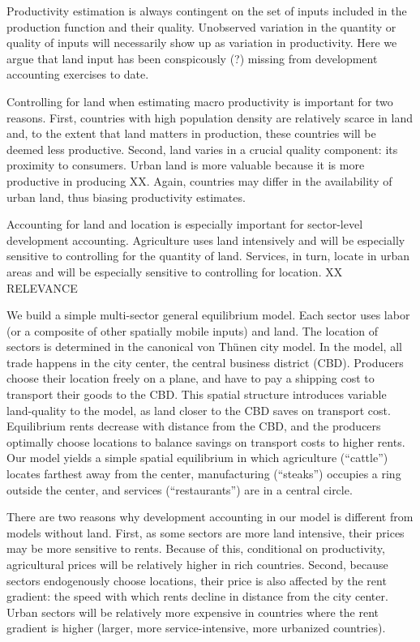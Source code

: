 \documentclass[12pt]{article}
\begin{document}
Productivity estimation is always contingent on the set of inputs included in the production function and their quality. Unobserved variation in the quantity or quality of inputs will necessarily show up as variation in productivity. Here we argue that land input has been conspicously (?) missing from development accounting exercises to date.

Controlling for land when estimating macro productivity is important for two reasons. First, countries with high population density are relatively scarce in land and, to the extent that land matters in production, these countries will be deemed less productive. Second, land varies in a crucial quality component: its proximity to consumers. Urban land is more valuable because it is more productive in producing XX. Again, countries may differ in the availability of urban land, thus biasing productivity estimates.

Accounting for land and location is especially important for sector-level development accounting. Agriculture uses land intensively and will be especially sensitive to controlling for the quantity of land. Services, in turn, locate in urban areas and will be especially sensitive to controlling for location. XX RELEVANCE

We build a simple multi-sector general equilibrium model. Each sector uses labor (or a composite of other spatially mobile inputs) and land. The location of sectors is determined in the canonical von Thünen city model. In the model, all trade happens in the city center, the central business district (CBD). Producers choose their location freely on a plane, and have to pay a shipping cost to transport their goods to the CBD. This spatial structure introduces variable land-quality to the model, as land closer to the CBD saves on transport cost. Equilibrium rents decrease with distance from the CBD, and the producers optimally choose locations to balance savings on transport costs to higher rents.
Our model yields a simple spatial equilibrium in which agriculture (``cattle'') locates farthest away from the center, manufacturing (``steaks'') occupies a ring outside the center, and services (``restaurants'') are in a central circle.

There are two reasons why development accounting in our model is different from models without land. First, as some sectors are more land intensive, their prices may be more sensitive to rents. Because of this, conditional on productivity, agricultural prices will be relatively higher in rich countries. Second, because sectors endogenously choose locations, their price is also affected by the rent gradient: the speed with which rents decline in distance from the city center. Urban sectors will be relatively more expensive in countries where the rent gradient is higher (larger, more service-intensive, more urbanized countries).
\end{document}
